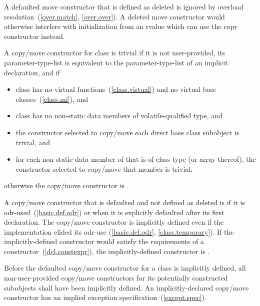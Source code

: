 A defaulted move constructor that is defined as deleted is ignored by overload
resolution~(\ref{over.match}, \ref{over.over}).
\enternote
A deleted move constructor would otherwise interfere with initialization from
an rvalue which can use the copy constructor instead.
\exitnote

\pnum
{}%
%
A copy/move constructor for class
is
trivial
if it is not user-provided, its parameter-type-list is equivalent to the parameter-type-list
of an implicit declaration, and if

\begin{itemize}
\item
class
has no virtual functions~(\ref{class.virtual})
and no virtual base classes~(\ref{class.mi}), and

\item class  has no non-static data members of volatile-qualified type, and

\item
the constructor selected to copy/move each direct base class subobject is trivial, and

\item
for each non-static data member of
that is of class type (or array thereof),
the constructor selected to copy/move that member is trivial;
\end{itemize}

otherwise the copy/move constructor is
.

\pnum
{}%
%
A copy/move constructor
that is defaulted and not defined as deleted
is
if it is odr-used~(\ref{basic.def.odr})
or when it is explicitly defaulted after its first declaration.
\enternote
The copy/move constructor is implicitly defined even if the implementation elided
its odr-use (\ref{basic.def.odr}, \ref{class.temporary}).
\exitnote
If the implicitly-defined constructor would satisfy the requirements of a
 constructor~(\ref{dcl.constexpr}), the implicitly-defined
constructor is .

\pnum
Before the defaulted copy/move constructor for a class is
implicitly defined,
all non-user-provided copy/move constructors for its
potentially constructed subobjects
shall have been implicitly defined.
\enternote
An implicitly-declared copy/move constructor has an
implied exception specification~(\ref{except.spec}).
\exitnote

